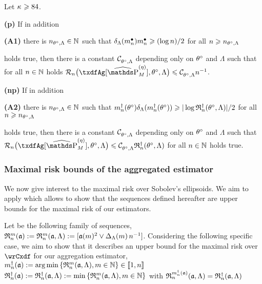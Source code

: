 \begin{cor}
  Let $\cpen \geq 84$.
  \begin{Liste}[]
  \item[{\dgrau\bfseries{(p)}}]
    If in addition
    \begin{inparaenum}\item[{{\dgrau\bfseries(A1)}}]
      there is $\ssY_{\xdf,\Lambda}\in\Nz$ such that
      $\cmiSv[\sDi{\ssY}]\sDi{\ssY}\geq (\log\ssY)/2$ for all
      $\ssY\geq \ssY_{\xdf,\Lambda}$
    \end{inparaenum}
    holds true, then there is a constant $\cst{\xdf,\Lambda}$ depending
    only on $\xdf$ and $\Lambda$ such that for all $n\in\Nz$ holds
    $\nRi{\txdfAg[{\erWe[]}]}{\xdf,\Lambda} \leq
    \cst{\xdf,\Lambda}\ssY^{-1}$.
  \item[{\dgrau\bfseries{(np)}}]
    If in addition
    \begin{inparaenum}\item[{{\dgrau\bfseries(A2)}}]
      there is  $\ssY_{\xdf,\Lambda}\in\Nz$ such that
      $\aDi{\ssY}(\xdf)\cmSv[\aDi{\ssY}(\xdf)]\geq \vert \log\naRa{(\xdf,\Lambda)} \vert/2 $
      for all $\ssY\geq \ssY_{\xdf,\Lambda}$
    \end{inparaenum}
    holds true, then there is a constant $\cst{\xdf,\Lambda}$ depending
    only on $\xdf$ and $\Lambda$ such that $\nRi{\txdfAg[{\erWe[]}]}{\xdf,\Lambda}
    \leq \cst{\xdf,\Lambda}\naRa{(\xdf,\Lambda)}$ for all $n\in\Nz$ holds true.
  \end{Liste} 
    \reEnd 
\end{cor}

\subsubsection{Maximal risk bounds of the aggregated estimator}\label{ak:mrb}\label{AK:MRB}
We now give interest to the maximal risk over Sobolev's ellipsoids.
We aim to apply  which allows to show that the sequences defined hereafter are upper bounds for the maximal risk of our estimators.
\begin{de*}
  Let be the following family of sequences,
  $\daRa{\Di}{(\xdfCw[])}:=\daRa{\Di}{(\xdfCw[],\Lambda)}:=[\xdfCw^2\vee \DipenSv\,\ssY^{-1}]$.
Considering the following specific case, we aim to show that it describes an upper bound for the maximal risk over $\rwCxdf$ for our aggregation estimator,
    $\aDi{\ssY}(\xdfCw[]):=\argmin\Nset[\Di\in\Nz]{\daRa{\Di}{(\xdfCw[],\Lambda)}}\in\nset{1,\ssY}$\\
    $\naRa{(\xdfCw[])}:=\naRa{(\xdfCw[],\Lambda)}:=\min\Nset[\Di\in\Nz]{\daRa{\Di}{(\xdfCw[],\Lambda)}}$
    with $\daRa{\aDi{\ssY}(\xdfCw[])}{(\xdfCw[],\Lambda)}=\naRa{(\xdfCw[],\Lambda)}$
\assEnd
\end{de*}

